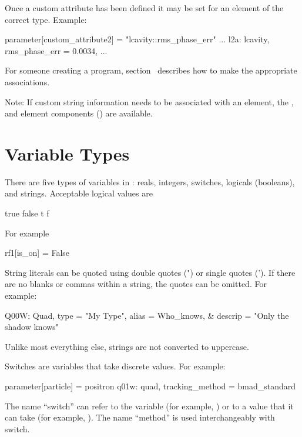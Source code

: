 {{Once a custom attribute has been defined it may be set for an element
of the correct type. Example:
\begin{example}
  parameter[custom_attribute2] = "lcavity::rms_phase_err"
  ...
  l2a: lcavity, rms_phase_err = 0.0034, ...
\end{example}

For someone creating a program, section~ describes how
to make the appropriate associations.

Note: If custom string information needs to be associated with an
element, the ,  and  element components
() are available.

\section{Variable Types}
\label{s:var.types}

There are five types of variables in \bmad: reals, integers, switches,
logicals (booleans), and strings. Acceptable logical values are
\begin{example}
   true    false
   t       f
\end{example}
For example
\begin{example}
  rf1[is_on] = False
\end{example}

String literals can be quoted using double quotes (") or single quotes ('). 
If there are no
blanks or commas within a string, the quotes can be omitted. For example:
\begin{example}
  Q00W: Quad, type = "My Type", alias = Who_knows, &
                                  descrip = "Only the shadow knows"
\end{example}
Unlike most everything else, strings are not converted to uppercase.

Switches are variables that take discrete values. For example:
\begin{example}
  parameter[particle] = positron          
  q01w: quad, tracking_method = bmad_standard 
\end{example}
The name ``switch'' can refer to the variable (for example,
) or to a value that it can take (for example,
). The name ``method'' is used interchangeably with switch.

}}
